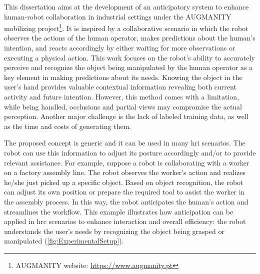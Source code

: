 This dissertation aims at the development of an anticipatory system to enhance human-robot collaboration in industrial settings under the AUGMANITY mobilizing project\footnote{AUGMANITY website: \url{https://www.augmanity.pt}}. It is inspired by a collaborative scenario in which the robot observes the actions of the human operator, makes predictions about the human’s intention, and reacts accordingly by either waiting for more observations or executing a physical action. This work focuses on the robot’s ability to accurately perceive and recognize the object being manipulated by the human operator as a key element in making predictions about its needs. Knowing the object in the user’s hand provides valuable contextual information revealing both current activity and future intention. However, this method comes with a limitation, while being handled, occlusions and partial views may compromise the actual perception. Another major challenge is the lack of labeled training data, as well as the time and costs of generating them. %


The proposed concept is generic and it can be used in many \acf{hri} scenarios. The robot can use this information to adjust its posture accordingly and/or to provide relevant assistance. For example, suppose a robot is collaborating with a worker on a factory assembly line. The robot observes the worker's action and realizes he/she just picked up a specific object. Based on object recognition, the robot can adjust its own position or prepare the required tool to assist the worker in the assembly process. In this way, the robot anticipates the human's action and streamlines the workflow. This example illustrates how anticipation can be applied in \acs{hrc} scenarios to enhance interaction and overall efficiency: the robot understands the user's needs by recognizing the object being grasped or manipulated (\autoref{fig:ExperimentalSetup}).

